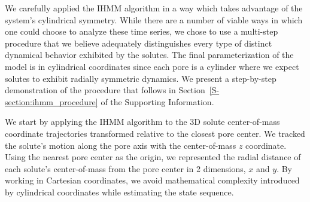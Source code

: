\documentclass[journal=jpcbfk,manuscript=article]{achemso}
\begin{document}
  We carefully applied the IHMM algorithm in a way which takes advantage of the
  system's cylindrical symmetry. While there
  are a number of viable ways in which one could choose to analyze these time series,
  we chose to use a multi-step procedure that we believe adequately distinguishes 
  every type of distinct dynamical behavior exhibited by the solutes. The final
  parameterization of the model is in cylindrical coordinates since each pore is a
  cylinder where we expect solutes to exhibit radially symmetric dynamics. We 
  present a step-by-step demonstration of the procedure that follows in 
  Section~\ref{S-section:ihmm_procedure} of the Supporting Information.
  
  We start by applying the IHMM algorithm to the 3D solute center-of-mass coordinate 
  trajectories transformed relative to the closest pore center. We tracked the solute's
  motion along the pore axis with the center-of-mass $z$ coordinate. Using the nearest
  pore center as the origin, we represented the radial distance of each solute's 
  center-of-mass from the pore center in 2 dimensions, $x$ and $y$.
  By working in Cartesian coordinates, we avoid
  mathematical complexity introduced by cylindrical coordinates while estimating the 
  state sequence.

  
\end{document}

